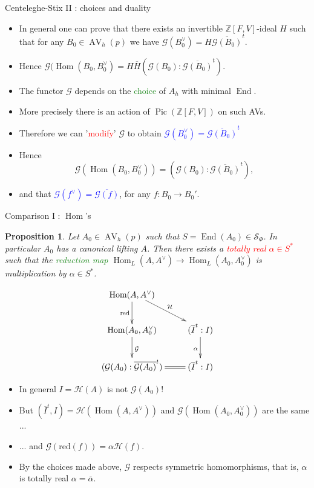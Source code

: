 \documentclass[usenames,dvipsnames,handout]{beamer}
\def\Z{\mathbb{Z}}
\DeclareMathOperator{\AV}{AV}
\DeclareMathOperator{\Pic}{Pic}
\DeclareMathOperator{\Hom}{Hom}
\DeclareMathOperator{\End}{End}
\newcommand{\cG}{\mathcal{G}}
\newcommand{\cH}{{\mathcal H}}
\newcommand{\red}[1]{\textcolor{red}{#1}}
\newcommand{\blue}[1]{\textcolor{blue}{#1}}
\newcommand{\green}[1]{\textcolor{ForestGreen}{#1}}
\newtheorem{prop}[df]{Proposition}
\begin{document}
\begin{frame}{ Centeleghe-Stix II : choices and duality}
    \begin{itemize}
     \item In general one can prove that there exists an invertible $\Z[F,V]$-ideal $H$ such that for any $B_0 \in \AV_h(p)$ we have $\cG(B_0^\vee) = H \overline{\cG(B_0)}^t$.
     \pause \item Hence $\cG(\Hom(B_0,B_0^\vee) = H\overline{H}(\cG(B_0):\overline{\cG(B_0)}^t)$.
	 \pause \item The functor $\cG$ depends on the \green{choice} of $A_h$ with minimal $\End$. 
	 \pause \item More precisely there is an action of $\Pic(\Z[F,V])$ on such AVs. 
	 \pause \item Therefore we can '\red{modify}' $\cG$ to obtain \blue{$\cG(B_0^\vee) = \overline{\cG(B_0)}^t$}
	 \pause \item Hence
	 \[ \cG(\Hom(B_0,B_0^\vee)) = (\cG(B_0):\overline{\cG(B_0)}^t), \]
	 \pause \item and that \blue{$\cG(f^\vee) = \overline{\cG(f)}$}, for any $f: B_0\to B_0'$.
	\end{itemize}
\end{frame}

\begin{frame}{ Comparison I : $\Hom$'s }
	\begin{prop}
		Let $A_0\in \AV_h(p)$ such that $S=\End(A_0)\in \mathcal{S}_\Phi$. In particular $A_0$ has a canonical lifting $A$.
		\pause Then there exists a \red{totally real $\alpha \in S^*$} such that the \green{reduction map} $\Hom_L(A,A^{\vee}) \to \Hom_L(A_0,A_0^{\vee})$ is multiplication by $\alpha \in S^*$.
	\end{prop}
	\pause \begin{minipage}{0.44\textwidth}
	\[
	\xymatrix{
	    \Hom(A,A^\vee) \ar[d]_{\mathrm{red}} \ar@<2pt>[dr]^{\mathcal{H}} & \\
	    \Hom(A_0,A_0^\vee)\ar[d]^{\cG} & (\overline I^t : I) \ar[d]_{\alpha} \\
	    (\cG(A_0) : \overline{\cG(A_0)}^t) & (\overline I^t : I) \ar@{=}[l]}
	\]
	\end{minipage}
	\begin{minipage}{0.55\textwidth}
	    \begin{itemize}
		 \pause \item In general $I=\cH(A)$ is not $\cG(A_0)$!
		 \pause \item But $(\overline{I}^t,I)=\cH(\Hom(A,A^\vee))$ and $\cG(\Hom(A_0,A_0^\vee))$ are the same ...
		 \pause \item ... and $\cG(\mathrm{red}(f)) = \alpha \cH(f)$.
		 \pause \item By the choices made above, $\cG$ respects symmetric homomorphisms, that is, $\alpha$ is totally real $\alpha = \overline{\alpha}$.
		\end{itemize}
	\end{minipage}
\end{frame}
\end{document}
